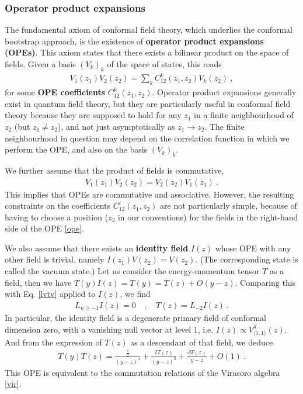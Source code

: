 \documentclass[12pt, a4paper]{article}
\theoremstyle{break}
\begin{document}
\subsubsection{Operator product expansions}\label{sec:ope}

The fundamental axiom of conformal field theory, which underlies the conformal bootstrap approach, is the existence of \textbf{operator product expansions (OPEs)}. This axiom states that there exists a bilinear product on the space of fields. Given a basis $(V_k)_k$ of the space of states, this reads 
\begin{align}
  \boxed{V_1(z_1)V_2(z_2) = \sum_k C^k_{12}(z_1,z_2) V_k(z_2)}\ ,
  \label{ope}
 \end{align}
for some \textbf{OPE coefficients} $C^k_{12}(z_1,z_2)$. Operator product expansions generally exist in quantum field theory, but they are particularly useful in conformal field theory because they are supposed to hold for any $z_1$ in a finite neighbourhood of $z_2$ (but $z_1\neq z_2$), and not just asymptotically as $z_1\to z_2$. The finite neighbourhood in question may depend on the correlation function in which we perform the OPE, and also on the basis $(V_k)_k$. 

We further assume that the product of fields is commutative,
\begin{align}
 \boxed{V_1(z_1)V_2(z_2) = V_2(z_2)V_1(z_1)}\ .
 \label{comm}
\end{align}
This implies that OPEs are commutative and associative. However, the resulting constraints on the coefficients $C^i_{12}(z_1,z_2)$ are not particularly simple, because of having to choose a position ($z_2$ in our conventions) for the fields in the right-hand side of the OPE \eqref{ope}. 

We also assume that there exists an \textbf{identity field} $I(z)$ whose OPE with any other field is trivial, namely $I(z_1)V(z_2) = V(z_2)$. (The corresponding state is called the vacuum state.) Let us consider the energy-momentum tensor $T$ as a field, then we have 
$
 T(y)I(z) = T(y) = T(z)  + O(y-z)
$. 
Comparing this with Eq. \eqref{lvtv} applied to $I(z)$, we find 
\begin{align}
 L_{n\geq -1} I(z) = 0 \quad , \quad T(z) = L_{-2}I(z)\ .
\end{align}
In particular, the identity field is a degenerate primary field of conformal dimension zero, with a vanishing null vector at level $1$, i.e. $I(z) \propto V^d_{\langle 1,1\rangle}(z)$. And from the expression of $T(z)$ as a descendant of that field, we deduce
\begin{align}
 T(y)T(z) = \frac{\frac{c}{2}}{(y-z)^4} + \frac{2T(z)}{(y-z)^2} + \frac{\partial T(z)}{y-z} + O(1)\ .
\label{tt}
\end{align}
This OPE is equivalent to the commutation relations of the Virasoro algebra \eqref{vir}.
\end{document}
